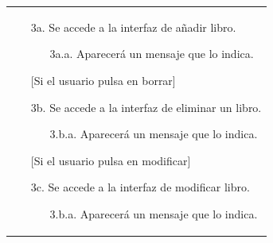 \documentclass{report}
\begin{document}
\begin{longtable}{|p{\linewidth}|}
\begin{enumerate}
                        \begin{enumerate}
                            \item[3a.] Se accede a la interfaz de añadir libro.
                            \begin{enumerate}
                                \item[3a.a.] Aparecerá un mensaje que lo indica.
                            \end{enumerate}
                    
                        [Si el usuario pulsa en borrar]
                            \item[3b.] Se accede a la interfaz de eliminar un libro.
                            \begin{enumerate}
                                \item[3.b.a.] Aparecerá un mensaje que lo indica.
                            \end{enumerate}

                         [Si el usuario pulsa en modificar]
                            \item[3c.] Se accede a la interfaz de modificar libro.
                            \begin{enumerate}
                                \item[3.b.a.] Aparecerá un mensaje que lo indica.
                            \end{enumerate}
                        \end{enumerate}
                    

\end{enumerate}
\end{longtable}
\end{document}
